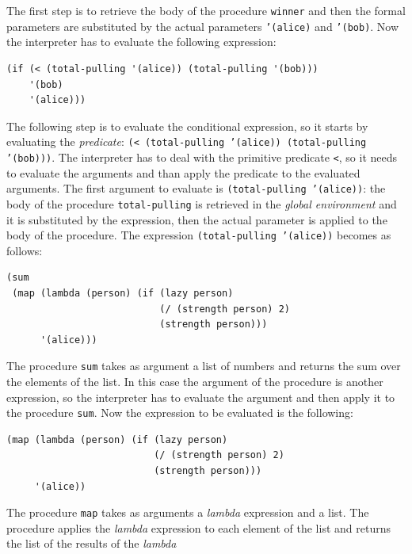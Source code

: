 \begin{itemize}
        The first step is to retrieve the body of the procedure \texttt{winner} and then the formal parameters are substituted by 
        the actual parameters \texttt{'(alice)} and \texttt{'(bob)}. 
        Now the interpreter has to evaluate the following expression:
        \begin{lstlisting}[caption={Body of procedure \texttt{winner} with actual parameters}, captionpos=b]
(if (< (total-pulling '(alice)) (total-pulling '(bob)))
    '(bob)
    '(alice)))  
        \end{lstlisting}
        The following step is to evaluate the conditional expression, so it starts by evaluating the \textit{predicate}: 
        \texttt{(< (total-pulling '(alice)) (total-pulling '(bob)))}. The interpreter has to deal with the primitive predicate
        \texttt{<}, so it needs to evaluate the arguments and than apply the predicate to the evaluated arguments.
        The first argument to evaluate is \texttt{(total-pulling '(alice))}: the body of the procedure \texttt{total-pulling} 
        is retrieved in the \textit{global environment} and it is substituted by the expression, 
        then the actual parameter is applied to the body of the procedure. The expression \texttt{(total-pulling '(alice))} becomes
        as follows:
        \begin{lstlisting}[caption={Body of procedure \texttt{total-pulling} with actual parameters}, captionpos=b, label={lst:t-p}]
(sum
 (map (lambda (person) (if (lazy person)
                           (/ (strength person) 2)
                           (strength person)))
      '(alice)))
        \end{lstlisting}
        The procedure \texttt{sum} takes as argument a list of numbers and returns the sum over the elements of the list. In this case
        the argument of the procedure is another expression, so the interpreter has to evaluate the argument and then apply it to the
        procedure \texttt{sum}.
        Now the expression to be evaluated is the following:
        \begin{lstlisting}[caption={Argument of procedure \texttt{sum} in Listing~\ref{lst:t-p}}, captionpos=b, label={lst:map}]
(map (lambda (person) (if (lazy person)
                          (/ (strength person) 2)
                          (strength person)))
     '(alice))
        \end{lstlisting}
        The procedure \texttt{map} takes as arguments a \textit{lambda} expression and a list. The procedure applies the
        \textit{lambda} expression to each element of the list and returns the list of the results of the \textit{lambda}

\end{itemize}
